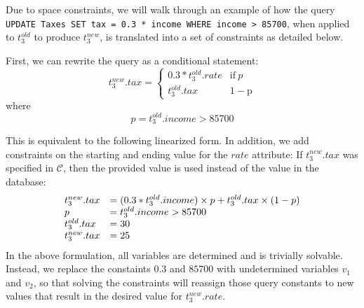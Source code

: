 
Due to space constraints, we will walk through an example of how the query
\texttt{UPDATE Taxes SET tax = 0.3 * income WHERE income > 85700}, when applied to 
$t_3^{old}$ to produce $t_3^{new}$, is translated into a set of constraints
as detailed below.

First, we can rewrite the query as a conditional statement:
\[
t_3^{new}.tax = \begin{cases}
				  0.3*t_3^{old}.rate              & \mathrm{if}\ p  \\
                  t_3^{old}.tax  & \mathrm{1-p}
               \end{cases}
\]
\vspace*{-0.03in}
where 
\vspace*{-0.03in}
\[p = t_3^{old}.income > 85700\]

This is equivalent to the following linearized form.
In addition, we add constraints on the starting and ending value for the $rate$ attribute:
If $t_3^{new}.tax$ was specified in $\mathcal{C}$, then the provided value
is used instead of the value in the database:
\vspace*{-0.03in}
\[
\begin{array}{l l l}
t_3^{new}.tax &= (0.3*t_3^{old}.income)\times p + t_3^{old}.tax\times (1-p)\\
p &= t_3^{old}.income > 85700\\
t_3^{old}.tax &= 30 \\
t_3^{new}.tax &= 25
\end{array}
\]
\vspace*{-0.03in}
In the above formulation, all variables are determined and is trivially
solvable.  Instead, we replace
the constaints $0.3$ and $85700$ with undetermined variables $v_1$ and $v_2$,
so that solving the constraints will reassign those query constants 
to new values that result in the desired value for $t_3^{new}.rate$.  
\iffalse
\[
\begin{array}{l l l}
t_3^{new}.tax &= (v_1*t_3^{old}.income)\times p + t_3^{old}.tax\times (1-p)\\
p              &= t_3^{old}.income > v_2\\
t_3^{old}.tax 30 \\
t_3^{new}.tax &= 25 \\
v_1            &\in [minval, maxval]\\
v_2            &\in [minval, maxval]\\
\end{array}
\]
\fi